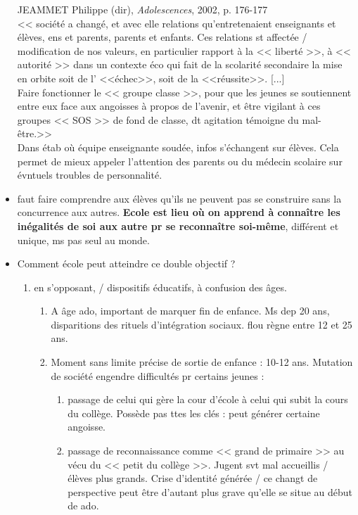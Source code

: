 \documentclass[12pt]{report}
\begin{document}
\begin{itemize}
{\begin{minipage}{19cm}
JEAMMET Philippe (dir), \textit{Adolescences}, 2002, p. 176-177 \\
 
<< société a changé, et avec elle relations qu'entretenaient enseignants et élèves, ens et parents, parents et enfants. Ces relations st affectée / modification de nos valeurs, en particulier rapport à la << liberté >>, à << autorité >> dans un contexte éco qui fait de la scolarité secondaire la mise en orbite soit de l' <<échec>>, soit de la <<réussite>>. [...] \\
Faire fonctionner le << groupe classe >>, pour que les jeunes se soutiennent entre eux face aux angoisses à propos de l'avenir, et être vigilant à ces groupes << SOS >> de fond de classe, dt agitation témoigne du mal-être.>> \\
Dans étab où équipe enseignante soudée, infos s'échangent sur élèves. Cela permet de mieux appeler l'attention des parents ou du médecin scolaire sur évntuels troubles de personnalité.\\
\end{minipage}
}

\item faut faire comprendre aux élèves qu'ils ne peuvent pas se construire sans la concurrence aux autres.\textbf{ Ecole est lieu où on apprend à connaître les inégalités de soi aux autre pr se reconnaître soi-même}, différent et unique, ms pas seul au monde. \\

\item Comment école peut atteindre ce double objectif ?
\begin{enumerate}
\item en s'opposant, / dispositifs éducatifs, à confusion des âges. \\
\begin{enumerate}
\item A âge ado, important de marquer fin de enfance. Ms dep 20 ans, disparitions des rituels d'intégration sociaux. flou règne entre 12 et 25 ans.\\
\item Moment sans limite précise de sortie de enfance : 10-12 ans. Mutation de société engendre difficultés pr certains jeunes : 
\begin{enumerate}
\item passage de celui qui gère la cour d'école à celui qui subit la cours du collège. Possède pas ttes les clés : peut générer certaine angoisse.\\
\item passage de reconnaissance comme << grand de primaire >> au vécu du << petit du collège >>. Jugent svt mal accueillis / élèves plus grands. Crise d'identité générée / ce changt de perspective peut être d'autant plus grave qu'elle se situe au début de ado.\\
\end{enumerate}


\end{enumerate}
\end{enumerate}
\end{itemize}
\end{document}
